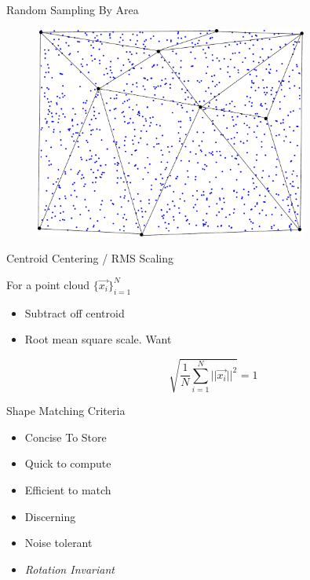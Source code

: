 \documentclass{beamer}
\begin{document}
\begin{frame}{Random Sampling By Area}

\begin{figure}[t]
	\centering
    \includegraphics[width=0.8\textwidth]{SampleByArea.pdf}
\end{figure}


\end{frame}


\begin{frame}{Centroid Centering / RMS Scaling}

For a point cloud $\{ \vec{x_i} \}_{i=1}^N$

\begin{itemize}[label=$\vartriangleright$]
\item Subtract off centroid
\item Root mean square scale.  Want

\[ \sqrt{ \frac{1}{N} \sum_{i=1}^N ||\vec{x_i}||^2 } = 1\]

\end{itemize}


\end{frame}

\begin{frame}{Shape Matching Criteria}

\begin{itemize}[label=$\vartriangleright$]
\item Concise To Store

\item Quick to compute


\item Efficient to match


\item Discerning


\item Noise tolerant 


\item {\em Rotation Invariant}

\end{itemize}

\end{frame}
\end{document}
